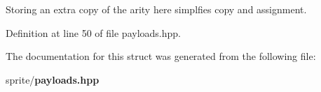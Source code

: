 \begin{Desc}
\item[Note:]Storing an extra copy of the arity here simplfies copy and assignment. \end{Desc}




Definition at line 50 of file payloads.hpp.

The documentation for this struct was generated from the following file:\begin{CompactItemize}
\item 
sprite/{\bf payloads.hpp}\end{CompactItemize}
